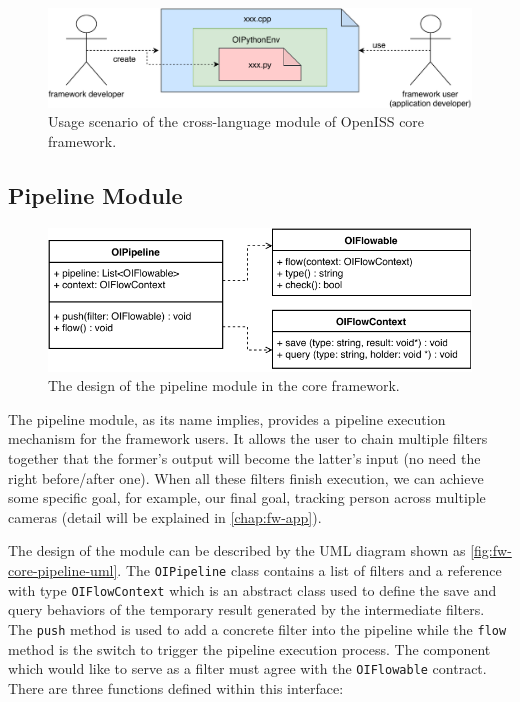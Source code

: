 \begin{figure}
    \centering
    \includegraphics[scale=0.8]{figures/framework_core_cross_lang2.pdf}
    \caption
    {Usage scenario of the cross-language module of OpenISS core framework.}
    \label{fig:fw-core-cross-lang2}
\end{figure}

\subsection{Pipeline Module}
\label{sec:fw-design-core-pipeline}

\begin{figure}
    \includegraphics[width=\linewidth]{figures/framework_core_pipeline.pdf}
    \caption{The design of the pipeline module in the core framework.}
    \label{fig:fw-core-pipeline-uml}
\end{figure}

The pipeline module, as its name implies, provides a pipeline execution
mechanism for the framework users. It allows the user to chain multiple
filters together that the former's output will become the 
latter's input (no need the right before/after one).
When all these filters finish execution, we can achieve some specific goal, for
example, our final goal, tracking person across multiple cameras (detail will
be explained in \autoref{chap:fw-app}).

The design of the module can be described by the UML diagram shown as
\autoref{fig:fw-core-pipeline-uml}. The \texttt{OIPipeline} class contains a
list of filters and a reference with type \texttt{OIFlowContext} which is an
abstract class used to define the save and query behaviors of the temporary
result generated by the intermediate filters. The \texttt{push} method is used
to add a concrete filter into the pipeline while the \texttt{flow} method is the
switch to trigger the pipeline execution process.
The component which would like to serve as a filter must agree with the
\texttt{OIFlowable} contract. There are three functions defined within this
interface:

